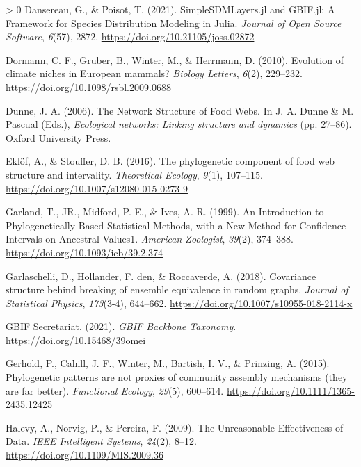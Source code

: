 \documentclass[11pt]{article}
\newlength{\cslhangindent}
\newenvironment{CSLReferences}[3] %
 {%
  \setlength{\parindent}{0pt}
  \ifodd #1 \everypar{\setlength{\hangindent}{\cslhangindent}}\ignorespaces\fi
  \ifnum #2 > 0
  \setlength{\parskip}{#2\baselineskip}
  \fi
 }%
 {}
\begin{document}
\begin{CSLReferences}{1}{0}
\leavevmode\hypertarget{ref-Dansereau2021SimJl}{}%
Dansereau, G., \& Poisot, T. (2021). SimpleSDMLayers.jl and GBIF.jl: A
Framework for Species Distribution Modeling in Julia. \emph{Journal of
Open Source Software}, \emph{6}(57), 2872.
\url{https://doi.org/10.21105/joss.02872}

\leavevmode\hypertarget{ref-Dormann2010EvoCli}{}%
Dormann, C. F., Gruber, B., Winter, M., \& Herrmann, D. (2010).
Evolution of climate niches in European mammals? \emph{Biology Letters},
\emph{6}(2), 229--232. \url{https://doi.org/10.1098/rsbl.2009.0688}

\leavevmode\hypertarget{ref-Dunne2006NetStr}{}%
Dunne, J. A. (2006). The Network Structure of Food Webs. In J. A. Dunne
\& M. Pascual (Eds.), \emph{Ecological networks: Linking structure and
dynamics} (pp. 27--86). Oxford University Press.

\leavevmode\hypertarget{ref-Eklof2016PhyCom}{}%
Eklöf, A., \& Stouffer, D. B. (2016). The phylogenetic component of food
web structure and intervality. \emph{Theoretical Ecology}, \emph{9}(1),
107--115. \url{https://doi.org/10.1007/s12080-015-0273-9}

\leavevmode\hypertarget{ref-Garland1999IntPhy}{}%
Garland, T., JR., Midford, P. E., \& Ives, A. R. (1999). An Introduction
to Phylogenetically Based Statistical Methods, with a New Method for
Confidence Intervals on Ancestral Values1. \emph{American Zoologist},
\emph{39}(2), 374--388. \url{https://doi.org/10.1093/icb/39.2.374}

\leavevmode\hypertarget{ref-Garlaschelli2018CovStr}{}%
Garlaschelli, D., Hollander, F. den, \& Roccaverde, A. (2018).
Covariance structure behind breaking of ensemble equivalence in random
graphs. \emph{Journal of Statistical Physics}, \emph{173}(3-4),
644--662. \url{https://doi.org/10.1007/s10955-018-2114-x}

\leavevmode\hypertarget{ref-GBIFSecretariat2021GbiBac}{}%
GBIF Secretariat. (2021). \emph{GBIF Backbone Taxonomy}.
\url{https://doi.org/10.15468/39omei}

\leavevmode\hypertarget{ref-Gerhold2015PhyPat}{}%
Gerhold, P., Cahill, J. F., Winter, M., Bartish, I. V., \& Prinzing, A.
(2015). Phylogenetic patterns are not proxies of community assembly
mechanisms (they are far better). \emph{Functional Ecology},
\emph{29}(5), 600--614. \url{https://doi.org/10.1111/1365-2435.12425}

\leavevmode\hypertarget{ref-Halevy2009UnrEff}{}%
Halevy, A., Norvig, P., \& Pereira, F. (2009). The Unreasonable
Effectiveness of Data. \emph{IEEE Intelligent Systems}, \emph{24}(2),
8--12. \url{https://doi.org/10.1109/MIS.2009.36}


\end{CSLReferences}
\end{document}

